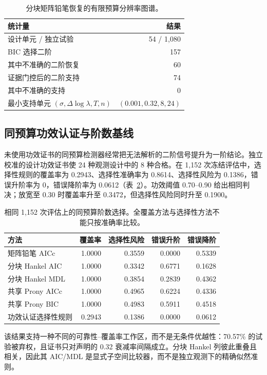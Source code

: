 \documentclass[UTF8,11pt]{ctexart}
\begin{document}
\begin{table}[H]
\centering
\caption{分块矩阵铅笔恢复的有限预算分辨率图谱。}
\label{tab:resolution-atlas-zh}
\begin{tabular}{lr}
\toprule
统计量 & 结果 \\
\midrule
设计单元 / 独立试验 & 54 / 1,080 \\
BIC 选择二阶 & 157 \\
其中不准确的二阶恢复 & 60 \\
证据门控后的二阶支持 & 74 \\
其中不准确的支持 & 0 \\
最小支持单元 $(\sigma,\Delta\log\lambda,T,n)$ & $(0.001,0.32,8,24)$ \\
\bottomrule
\end{tabular}
\end{table}
\subsection{同预算功效认证与阶数基线}
未使用功效证书的同预算检测器经常把无法解析的二阶信号提升为一阶结论。独立校准的设计功效证书使 24 种观测设计中的 8 种合格。在 1,152 次冻结评估中，选择性规则的覆盖率为 0.2943、选择性准确率为 0.8614、选择性风险为 0.1386，错误升阶率为 0，错误降阶率为 0.0612（表~\ref{tab:common-budget-zh}）。功效阈值 0.70--0.90 给出相同判决；放宽至 0.30 时覆盖率升至 0.3472，但选择性风险同时升至 0.1900。

\begin{table}[H]
\centering
\caption{相同 1,152 次评估上的同预算阶数选择。全覆盖方法与选择性方法不能只按准确率比较。}
\label{tab:common-budget-zh}
\begin{tabular}{lrrrr}
\toprule
方法 & 覆盖率 & 选择性风险 & 错误升阶 & 错误降阶 \\
\midrule
矩阵铅笔 AICc & 1.0000 & 0.3559 & 0.0000 & 0.5339 \\
分块 Hankel AIC & 1.0000 & 0.3342 & 0.6771 & 0.1628 \\
分块 Hankel MDL & 1.0000 & 0.3854 & 0.2839 & 0.4362 \\
共享 Prony AICc & 1.0000 & 0.4965 & 0.6224 & 0.4336 \\
共享 Prony BIC & 1.0000 & 0.4983 & 0.5911 & 0.4518 \\
功效认证选择性规则 & 0.2943 & 0.1386 & 0.0000 & 0.0612 \\
\bottomrule
\end{tabular}
\end{table}

该结果支持一种不同的可靠性--覆盖率工作区，而不是无条件优越性：70.57\% 的试验被弃权，且证书只对声明的 0.32 衰减率间隔成立。分块 Hankel 列彼此重叠且相关，因此其 AIC/MDL 是显式子空间比较器，而不是独立观测下的精确似然准则。
\end{document}
